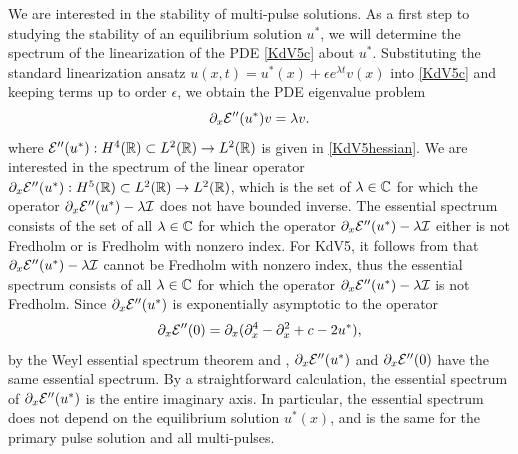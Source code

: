 \documentclass[11pt,reqno]{amsart}
\theoremstyle{plain}
\theoremstyle{definition}
\theoremstyle{remark}
\begin{document}
We are interested in the stability of multi-pulse solutions. As a first step to studying the stability of an equilibrium solution $u^*$, we will determine the spectrum of the linearization of the PDE \eqref{KdV5c} about $u^*$. Substituting the standard linearization ansatz $u(x, t) = u^*(x) + \epsilon e^{\lambda t} v(x)$ into \eqref{KdV5c} and keeping terms up to order $\epsilon$, we obtain the PDE eigenvalue problem
\begin{equation}\label{KdV5PDEevp}
\partial_x \mathcal{E}''(u^*) v = \lambda v.
\end{equation}
where $\mathcal{E}''(u^*): H^4(\mathbb{R}) \subset L^2(\mathbb{R}) \rightarrow L^2(\mathbb{R})$ is given in \cref{KdV5hessian}. We are interested in the spectrum of the linear operator $\partial_x \mathcal{E}''(u^*): H^5(\mathbb{R}) \subset L^2(\mathbb{R}) \rightarrow L^2(\mathbb{R})$, which is the set of $\lambda \in \mathbb{C}$ for which the operator $\partial_x \mathcal{E}''(u^*) - \lambda \mathcal{I}$ does not have bounded inverse. The essential spectrum consists of the set of all $\lambda \in \mathbb{C}$ for which the operator $\partial_x \mathcal{E}''(u^*) - \lambda \mathcal{I}$ either is not Fredholm or is Fredholm with nonzero index. For KdV5, it follows from \cite[Theorem 3.1.11]{Kapitula2013} that $\partial_x \mathcal{E}''(u^*) - \lambda \mathcal{I}$ cannot be Fredholm with nonzero index, thus the essential spectrum consists of all $\lambda \in \mathbb{C}$ for which the operator $\partial_x \mathcal{E}''(u^*) - \lambda \mathcal{I}$ is not Fredholm. Since $\partial_x \mathcal{E}''(u^*)$ is exponentially asymptotic to the operator 
\[
\partial_x \mathcal{E}''(0) = \partial_x(\partial_x^4 - \partial_x^2 + c - 2 u^*),
\]
by the Weyl essential spectrum theorem \cite[Theorem 2.2.6]{Kapitula2013} and \cite[Theorem 3.1.11]{Kapitula2013}, $\partial_x \mathcal{E}''(u^*)$ and $\partial_x \mathcal{E}''(0)$ have the same essential spectrum. By a straightforward calculation, the essential spectrum of $\partial_x \mathcal{E}''(u^*)$ is the entire imaginary axis. In particular, the essential spectrum does not depend on the equilibrium solution $u^*(x)$, and is the same for the primary pulse solution and all multi-pulses.
\end{document}
